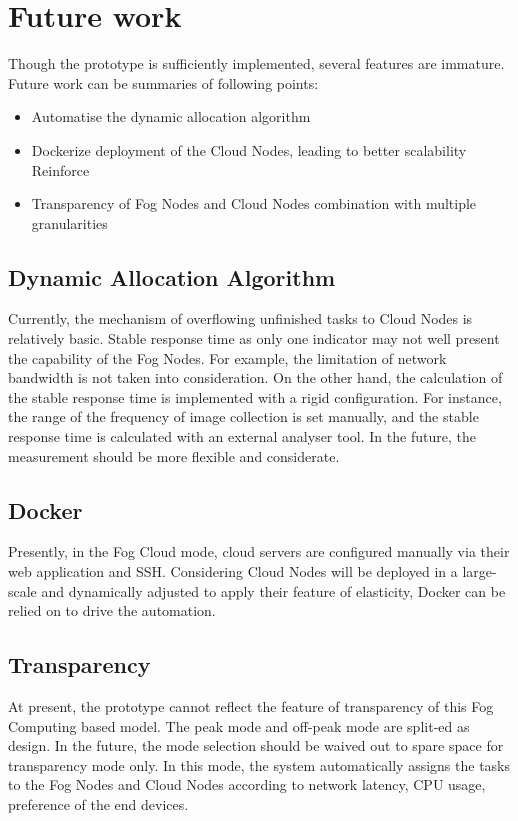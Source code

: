 \chapter{Future work} \label{chap:future}
Though the prototype is sufficiently implemented, several features are immature. Future work can be summaries of following points:

\begin{itemize}
    \item Automatise the dynamic allocation algorithm
    \item Dockerize deployment of the Cloud Nodes, leading to better scalability  Reinforce
    \item Transparency of Fog Nodes and Cloud Nodes combination with multiple granularities  
\end{itemize}
 
\section{Dynamic Allocation Algorithm}
Currently, the mechanism of overflowing unfinished tasks to Cloud Nodes is relatively basic. Stable response time as only one indicator may not well present the capability of the Fog Nodes. For example, the limitation of network bandwidth is not taken into consideration. On the other hand, the calculation of the stable response time is implemented with a rigid configuration. For instance, the range of the frequency of image collection is set manually, and the stable response time is calculated with an external analyser tool. In the future, the measurement should be more flexible and considerate.

\section{Docker}
Presently, in the Fog Cloud mode, cloud servers are configured manually via their web application and SSH. Considering Cloud Nodes will be deployed in a large-scale and dynamically adjusted to apply their feature of elasticity, Docker can be relied on to drive the automation.

\section{Transparency}
At present, the prototype cannot reflect the feature of transparency of this Fog Computing based model. The peak mode and off-peak mode are split-ed as design. In the future, the mode selection should be waived out to spare space for transparency mode only. In this mode, the system automatically assigns the tasks to the Fog Nodes and Cloud Nodes according to network latency, CPU usage, preference of the end devices.